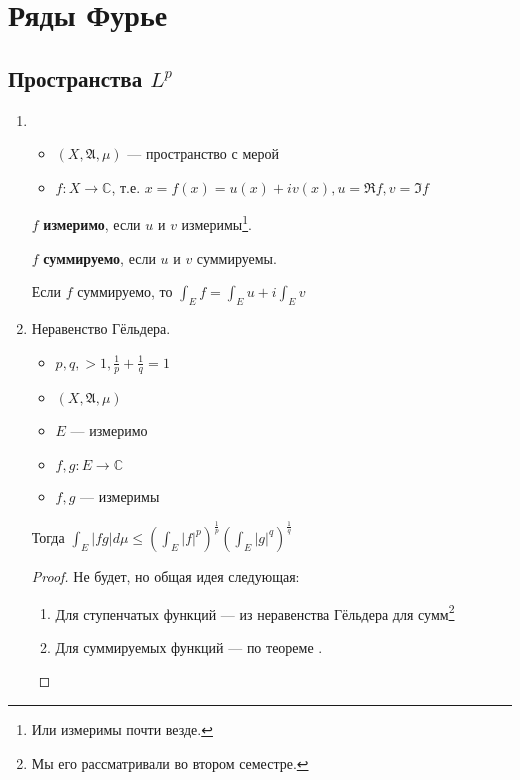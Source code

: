 \section{Ряды Фурье}

\subsection{Пространства \(L^p\)}

\begin{enumerate}
    \item \begin{itemize}
              \item \((X, \mathfrak{A}, \mu)\) --- пространство с мерой
              \item \(f : X \to \mathbb C\), т.е. \(x = f(x) = u(x) + iv(x), u = \Re f, v = \Im f\)
          \end{itemize}

          \(f\) \textbf{измеримо}, если \(u\) и \(v\) измеримы\footnote{Или измеримы почти везде.}.

          \(f\) \textbf{суммируемо}, если \(u\) и \(v\) суммируемы.

          Если \(f\) суммируемо, то \(\int_E f = \int_E u + i \int_E v\)

    \item Неравенство Гёльдера.

          \begin{itemize}
              \item \(p, q, > 1, \frac{1}{p} + \frac{1}{q} = 1\)
              \item \((X, \mathfrak{A}, \mu)\)
              \item \(E\) --- измеримо
              \item \(f, g : E \to \mathbb C\)
              \item \(f, g\) --- измеримы
          \end{itemize}

          Тогда \(\int_E |fg| d\mu \leq \left( \int_E |f|^p \right)^{\frac{1}{p}} \left( \int_E |g|^q \right)^{\frac{1}{q}}\)
          \begin{proof}
              Не будет, но общая идея следующая:
              \begin{enumerate}
                  \item Для ступенчатых функций --- из неравенства Гёльдера для сумм\footnote{Мы его рассматривали во втором семестре.}
                  \item Для суммируемых функций --- по теореме .
              \end{enumerate}
          \end{proof}


\end{enumerate}
